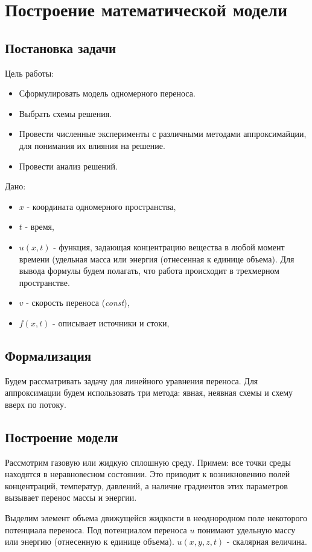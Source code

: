 \chapter{Построение математической модели}
\section{Постановка задачи}
Цель работы:
\begin{itemize}
	\item Сформулировать  модель одномерного переноса.
	\item Выбрать схемы решения.
	\item Провести численные эксперименты с различными методами аппроксимайции, для понимания их влияния на решение.
	\item Провести анализ решений.
\end{itemize}

Дано:
\begin{itemize}

	\item ${x}$ - координата одномерного пространства,
	\item $t$ - время,
		\item  $u(x,t)$ - функция, задающая концентрацию вещества в любой момент времени (удельная масса или
		энергия (отнесенная к единице объема). Для вывода формулы будем полагать, что работа происходит в трехмерном пространстве.
	\item $v $ - скорость переноса (\textit{const}),
	\item $f(x,t)$ - описывает источники и стоки,
\end{itemize}
\section{Формализация}
Будем рассматривать задачу для линейного уравнения переноса.
Для аппроксимации будем использовать три метода: явная, неявная схемы и схему вверх по потоку.

\newpage
\section{Построение модели}
Рассмотрим газовую или жидкую сплошную среду. Примем: все точки среды
находятся в неравновесном состоянии. Это приводит к возникновению полей
концентраций, температур, давлений, а наличие градиентов этих параметров вызывает
перенос массы и энергии.

Выделим элемент объема движущейся жидкости в неоднородном поле некоторого
потенциала переноса. Под потенциалом переноса
$u$ понимают удельную массу или
энергию (отнесенную к единице объема).
$u (x, y, z, t)$ - скалярная величина.

